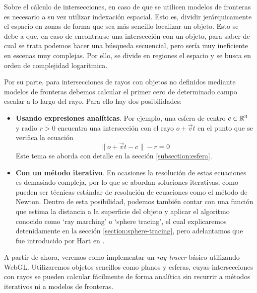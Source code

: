 Sobre el cálculo de intersecciones, en caso de que se utilicen modelos de fronteras es necesario a su vez utilizar indexación espacial. Esto es, dividir jerárquicamente el espacio en zonas de forma que sea más sencillo localizar un objeto. Esto se debe a que, en caso de encontrarse una intersección con un objeto, para saber de cual se trata podemos hacer una búsqueda secuencial, pero sería muy ineficiente en escenas muy complejas. Por ello, se divide en regiones el espacio y se busca en orden de complejidad logarítmica.

Por su parte, para intersecciones de rayos con objetos no definidos mediante modelos de fronteras debemos calcular el primer cero de determinado campo escalar a lo largo del rayo. Para ello hay dos posibilidades:
\begin{itemize}
    \item \textbf{Usando expresiones analíticas}. Por ejemplo, una esfera de centro $c\in\mathbb{R}^3$ y radio $r>0$ encuentra una intersección con el rayo $o+\vec v t$ en el punto que se verifica la ecuación
    $$
    \|o+\vec v t - c\| - r = 0
    $$
    Este tema se aborda con detalle en la sección \ref{subsection:esfera}.
    \item \textbf{Con un método iterativo}. En ocasiones la resolución de estas ecuaciones es demasiado compleja, por lo que se abordan soluciones iterativas, como pueden ser técnicas estándar de resolución de ecuaciones como el método de Newton. Dentro de esta posibilidad, podemos también contar con una función que estima la distancia a la superficie del objeto y aplicar el algoritmo conocido como `ray marching' o `sphere tracing', el cual explicaremos detenidamente en la sección \ref{section:sphere-tracing}, pero adelantamos que fue introducido por Hart en \cite{Hart-1995}.
\end{itemize}

A partir de ahora, veremos como implementar un \textit{ray-tracer} básico utilizando WebGL. Utilizaremos objetos sencillos como planos y esferas, cuyas intersecciones con rayos se pueden calcular fácilmente de forma analítica sin recurrir a métodos iterativos ni a modelos de fronteras.

